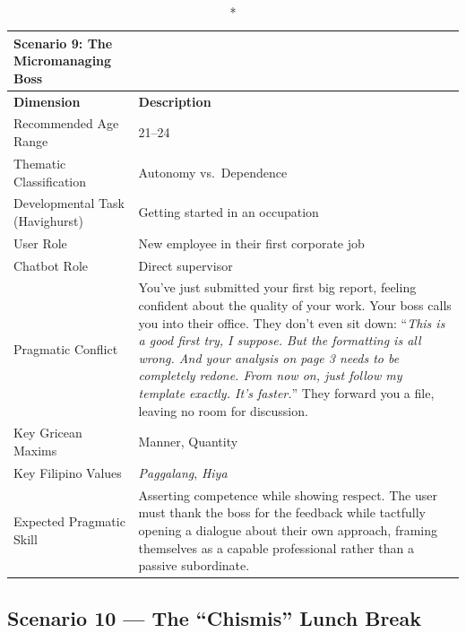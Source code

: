 \begin{longtable}{p{4.5cm} p{11cm}}
\caption*{Scenario 9: The Micromanaging Boss} \\
\toprule
\textbf{Dimension} & \textbf{Description} \\
\midrule
\endhead
Recommended Age Range          & 21--24 \\
\midrule
Thematic Classification        & Autonomy vs.\ Dependence \\
\midrule
Developmental Task (Havighurst)& Getting started in an occupation \\
\midrule
User Role                      & New employee in their first corporate job \\
\midrule
Chatbot Role                   & Direct supervisor \\
\midrule
Pragmatic Conflict             & You've just submitted your first big report, feeling confident about the
                                 quality of your work. Your boss calls you into their office. They don't
                                 even sit down: ``\textit{This is a good first try, I suppose. But the
                                 formatting is all wrong. And your analysis on page 3 needs to be
                                 completely redone. From now on, just follow my template exactly. It's
                                 faster.}'' They forward you a file, leaving no room for discussion. \\
\midrule
Key Gricean Maxims             & Manner, Quantity \\
\midrule
Key Filipino Values            & \textit{Paggalang}, \textit{Hiya} \\
\midrule
Expected Pragmatic Skill       & Asserting competence while showing respect. The user must thank the boss
                                 for the feedback while tactfully opening a dialogue about their own
                                 approach, framing themselves as a capable professional rather than
                                 a passive subordinate. \\
\bottomrule
\end{longtable}
 
\subsection*{Scenario 10 --- The ``Chismis'' Lunch Break}
 
